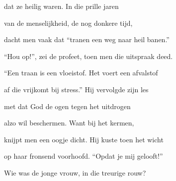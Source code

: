 dat ze heilig waren.
In die prille jaren

van de menselijkheid,
de nog donkere tijd,

dacht men vaak dat “tranen
een weg naar heil banen.”

“Hou op!”, zei de profeet,
toen men die uitspraak deed.

“Een traan is een vloeistof.
Het voert een afvalstof

af die vrijkomt bij stress.”
Hij vervolgde zijn les

met dat God de ogen
tegen het uitdrogen

alzo wil beschermen.
Want bij het kermen,

knijpt men een oogje dicht.
Hij kuste toen het wicht

op haar fronsend voorhoofd.
“Opdat je mij gelooft!”

Wie was de jonge vrouw,
in die treurige rouw?
